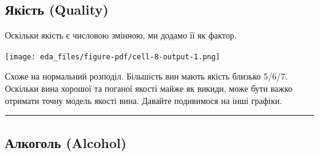 \documentclass[
  letterpaper,
  DIV=11,
  numbers=noendperiod]{scrreprt}
\newenvironment{Shaded}{\begin{snugshade}}{\end{snugshade}}
\newcommand{\AttributeTok}[1]{\textcolor[rgb]{0.40,0.45,0.13}{#1}}
\newcommand{\DecValTok}[1]{\textcolor[rgb]{0.68,0.00,0.00}{#1}}
\newcommand{\FunctionTok}[1]{\textcolor[rgb]{0.28,0.35,0.67}{#1}}
\newcommand{\NormalTok}[1]{\textcolor[rgb]{0.00,0.23,0.31}{#1}}
\newcommand{\OtherTok}[1]{\textcolor[rgb]{0.00,0.23,0.31}{#1}}
\newcommand{\SpecialCharTok}[1]{\textcolor[rgb]{0.37,0.37,0.37}{#1}}
\begin{document}
\subsection{Якість
(Quality)}\label{ux44fux43aux456ux441ux442ux44c-quality}

Оскільки якість є числовою змінною, ми додамо її як фактор.

\begin{Shaded}
\end{Shaded}

\texttt{[image: eda\_files/figure-pdf/cell-8-output-1.png]}

Схоже на нормальний розподіл. Більшість вин мають якість близько 5/6/7.
Оскільки вина хорошої та поганої якості майже як викиди, може бути важко
отримати точну модель якості вина. Давайте подивимося на інші графіки.

\begin{center}\rule{0.5\linewidth}{0.5pt}\end{center}

\subsection{Алкоголь
(Alcohol)}\label{ux430ux43bux43aux43eux433ux43eux43bux44c-alcohol}
\end{document}
